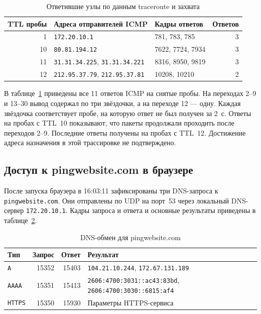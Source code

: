 \documentclass[a4paper,14pt]{extarticle}
\begin{document}
\begin{table}[htbp]
  \centering
  \caption{Ответившие узлы по данным traceroute и захвата}
  \label{tab:trace}
  \begin{tabularx}{\linewidth}{@{}r X l r@{}}
    \toprule
    TTL пробы & Адреса отправителей ICMP & Кадры ответов & Ответов \\
    \midrule
    1  & \texttt{172.20.10.1} & 781, 783, 785 & 3 \\
    10 & \texttt{80.81.194.12} & 7622, 7724, 7934 & 3 \\
    11 & \texttt{31.31.34.225}, \texttt{31.31.34.221} & 8316, 8950, 9819 & 3 \\
    12 & \texttt{212.95.37.79}, \texttt{212.95.37.81} & 10208, 10210 & 2 \\
    \bottomrule
  \end{tabularx}
\end{table}

В таблице~\ref{tab:trace} приведены все 11 ответов ICMP на снятые пробы. На переходах 2--9 и 13--30 вывод содержал по три звёздочки, а на переходе 12 --- одну. Каждая звёздочка соответствует пробе, на которую ответ не был получен за 2~с. Ответы на пробах с TTL~10 показывают, что пакеты продолжали проходить после переходов 2--9. Последние ответы получены на пробах с TTL~12. Достижение адреса назначения в этой трассировке не подтверждено.
\clearpage

\subsection{Доступ к pingwebsite.com в браузере}

После запуска браузера в 16:03:11 зафиксированы три DNS-запроса к \texttt{pingwebsite.com}. Они отправлены по UDP на порт~53 через локальный DNS-сервер \texttt{172.20.10.1}. Кадры запроса и ответа и основные результаты приведены в таблице~\ref{tab:dns}.

\begin{table}[htbp]
  \centering
  \caption{DNS-обмен для pingwebsite.com}
  \label{tab:dns}
  \begin{tabularx}{\linewidth}{@{}l r r >{\raggedright\arraybackslash}X@{}}
    \toprule
    Тип & Запрос & Ответ & Результат \\
    \midrule
    \texttt{A} & 15352 & 15403 & \texttt{104.21.10.244}, \texttt{172.67.131.189} \\
    \texttt{AAAA} & 15351 & 15413 & \texttt{2606:4700:3031::ac43:83bd}, \texttt{2606:4700:3030::6815:af4} \\
    \texttt{HTTPS} & 15350 & 15930 & Параметры HTTPS-сервиса \\
    \bottomrule
  \end{tabularx}
\end{table}
\end{document}
